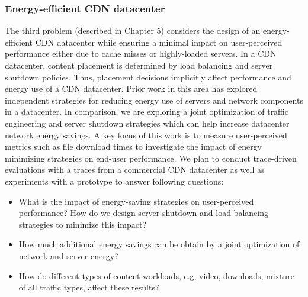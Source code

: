 \subsubsection{Energy-efficient CDN datacenter}

The third problem (described in Chapter 5) considers the design of an energy-efficient CDN datacenter while ensuring a minimal impact on user-perceived performance either due to cache misses or highly-loaded servers.
In a CDN datacenter, content placement is determined by load balancing and server shutdown policies. 
Thus, placement decisions implicitly affect performance and energy use of a CDN datacenter. 
Prior work in this area has explored independent strategies for reducing energy use of servers and network components in a datacenter. In comparison, we are exploring  a joint optimization of traffic engineering and server shutdown strategies which can help increase datacenter network energy savings.
A key focus of this work is to measure user-perceived metrics such as file download times to investigate the impact of energy minimizing strategies on end-user performance. 
We plan to conduct  trace-driven evaluations with a traces from a commercial CDN datacenter as well as experiments with a prototype to answer following questions:
\begin{itemize}
\item
What is the impact of energy-saving strategies on user-perceived performance? How do we design server shutdown and load-balancing strategies to minimize this impact?
\item
How much additional energy savings can be obtain by a joint optimization of network and server energy?
\item
How do different types of content workloads, e.g, video, downloads, mixture of all traffic types, affect these results?
\end{itemize}
